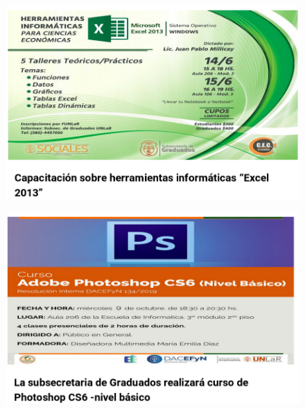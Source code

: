 \documentclass{fancyslides}
\begin{document}
\begin{frame}
	\begin{figure}
		\centering
		\includegraphics[width=1\linewidth]{images/excel3}
		\caption{}
		\label{fig:excel3}
	\end{figure}
	
\end{frame}

\begin{frame}
\begin{figure}
	\centering
	\includegraphics[width=1\linewidth]{images/excel4}
	\caption{}
	\label{fig:excel4}
\end{figure}
\end{frame}
\end{document}
